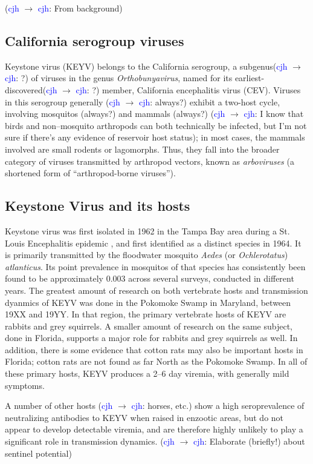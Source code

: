 \documentclass{article}
\newcommand{\cjh}{\textcolor{blue}{cjh}}
\newcommand{\msg}[3]{(#1 $\rightarrow$ #2: #3)}
\newcommand{\mcc}[1]{\msg\cjh\cjh{#1}}
\begin{document}
        \mcc{From background}
        \subsection{California serogroup viruses}
            Keystone virus (KEYV) belongs to the California serogroup, a subgenus\mcc{?} of viruses in the genus \textit{Orthobunyavirus}, named for its earliest-discovered\mcc{?} member, California encephalitis virus (CEV). Viruses in this serogroup generally \mcc{always?} exhibit a two-host cycle, involving mosquitos (always?) and mammals (always?) \mcc{I know that birds and non--mosquito arthropods can both technically be infected, but I'm not sure if there's any evidence of reservoir host status}; in most cases, the mammals involved are small rodents or lagomorphs. Thus, they fall into the broader category of viruses transmitted by arthropod vectors, known as \textit{arboviruses} (a shortened form of ``arthropod-borne viruses'').
        
        \subsection{Keystone Virus and its hosts}
            Keystone virus was first isolated in 1962 in the Tampa Bay area during a St. Louis Encephalitis epidemic \cite{asdf}, and first identified as a distinct species in 1964. It is primarily transmitted by the floodwater mosquito \textit{Aedes} (or \textit{Ochlerotatus}) \textit{atlanticus}. Its point prevalence in mosquitos of that species has consistently been found to be approximately 0.003 across several surveys, conducted in different years. The greatest amount of research on both vertebrate hosts and transmission dyanmics of KEYV was done in the Pokomoke Swamp in Maryland, between 19XX and 19YY. In that region, the primary vertebrate hosts of KEYV are rabbits and grey squirrels. A smaller amount of research on the same subject, done in Florida, supports a major role for rabbits and grey squirrels as well. In addition, there is some evidence that cotton rats may also be important hosts in Florida\cite{asdf}; cotton rats are not found as far North as the Pokomoke Swamp. In all of these primary hosts, KEYV produces a 2--6 day viremia, with generally mild symptoms.

            A number of other hosts \mcc{horses, etc.} show a high seroprevalence of neutralizing antibodies to KEYV when raised in enzootic areas, but do not appear to develop detectable viremia, and are therefore highly unlikely to play a significant role in transmission dynamics. \mcc{Elaborate (briefly!) about sentinel potential}
\end{document}

